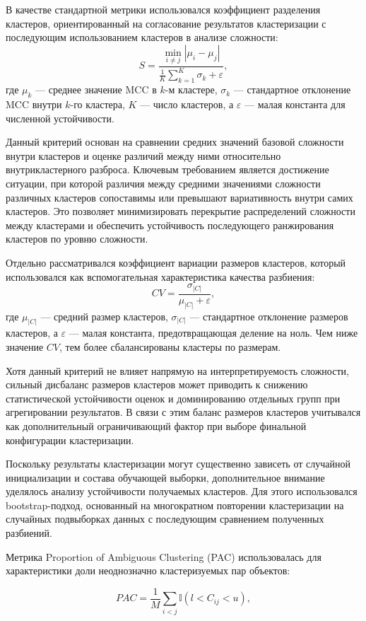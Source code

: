 \documentclass[specification,annotation,times]{itmo-student-thesis}
\begin{document}
В качестве стандартной метрики использовался коэффициент разделения кластеров, ориентированный на согласование результатов кластеризации с последующим использованием кластеров в анализе сложности:
\[
S = \frac{\min_{i \neq j} \left| \mu_i - \mu_j \right|}{\frac{1}{K} \sum_{k=1}^{K} \sigma_k + \varepsilon},
\]
где $\mu_k$ — среднее значение MCC в $k$-м кластере, 
$\sigma_k$ — стандартное отклонение MCC внутри $k$-го кластера, 
$K$ — число кластеров, а $\varepsilon$ — малая константа для численной устойчивости.

Данный критерий основан на сравнении средних значений базовой сложности внутри кластеров и оценке различий между ними относительно внутрикластерного разброса. Ключевым требованием является достижение ситуации, при которой различия между средними значениями сложности различных кластеров сопоставимы или превышают вариативность внутри самих кластеров. Это позволяет минимизировать перекрытие распределений сложности между кластерами и обеспечить устойчивость последующего ранжирования кластеров по уровню сложности.

Отдельно рассматривался коэффициент вариации размеров кластеров, который использовался как вспомогательная характеристика качества разбиения:
\[
CV = \frac{\sigma_{|C|}}{\mu_{|C|} + \varepsilon},
\]
где $\mu_{|C|}$ --- средний размер кластеров, $\sigma_{|C|}$ --- стандартное отклонение размеров кластеров, а $\varepsilon$ — малая константа, предотвращающая деление на ноль. Чем ниже значение $CV$, тем более сбалансированы кластеры по размерам.

Хотя данный критерий не влияет напрямую на интерпретируемость сложности, сильный дисбаланс размеров кластеров может приводить к снижению статистической устойчивости оценок и доминированию отдельных групп при агрегировании результатов. В связи с этим баланс размеров кластеров учитывался как дополнительный ограничивающий фактор при выборе финальной конфигурации кластеризации.

Поскольку результаты кластеризации могут существенно зависеть от случайной инициализации и состава обучающей выборки, дополнительное внимание уделялось анализу устойчивости получаемых кластеров. Для этого использовался bootstrap-подход, основанный на многократном повторении кластеризации на случайных подвыборках данных с последующим сравнением полученных разбиений.

Метрика Proportion of Ambiguous Clustering (PAC) использовалась для характеристики доли неоднозначно кластеризуемых пар объектов:

\[
PAC =
\frac{1}{M}
\sum_{i<j}
\mathbb{I}
\left(
l < C_{ij} < u
\right),
\]
\end{document}
